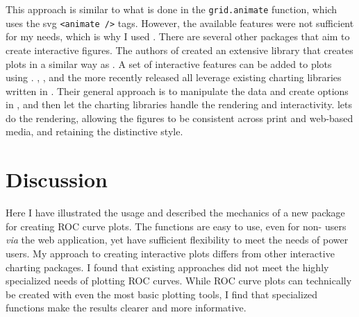 \documentclass[article]{jss}
\begin{document}
This approach is similar to what is done in the 
\texttt{grid.animate} function, which uses the svg
\texttt{\textless{}animate /\textgreater{}} tags. However, the available
features were not sufficient for my needs, which is why I used
. There are several other  packages that aim to
create interactive figures. The authors of  \citep{animint}
created an extensive  library that creates plots in
a similar way as . A set of interactive features can be
added to plots using .  \citep{ggvis},
 \citep{rcharts}, and the more recently released
 \citep{htmlwidgets} all leverage existing charting
libraries written in . Their general approach is to
manipulate the data and create options in , and then let the
charting libraries handle the rendering and interactivity. 
lets  do the rendering, allowing the figures to be
consistent across print and web-based media, and retaining the
distinctive  style.

\section{Discussion}\label{discussion}

Here I have illustrated the usage and described the mechanics of a new
 package for creating ROC curve plots. The functions are
easy to use, even for non- users \emph{via} the web
application, yet have sufficient flexibility to meet the needs of power
users. My approach to creating interactive plots differs from other
interactive charting packages. I found that existing approaches did not
meet the highly specialized needs of plotting ROC curves. While ROC
curve plots can technically be created with even the most basic plotting
tools, I find that specialized functions make the results clearer and
more informative.


%

\end{document}
